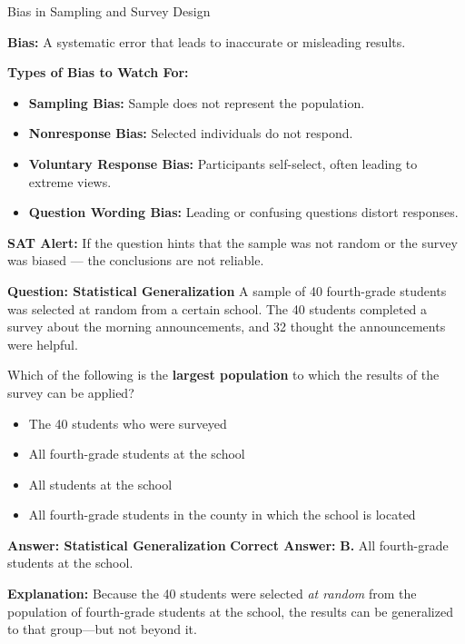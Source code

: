 \documentclass{beamer}
\begin{document}
\begin{frame}{Bias in Sampling and Survey Design}
\small

\textbf{Bias:} A systematic error that leads to inaccurate or misleading results.

\vspace{0.2cm}
\textbf{Types of Bias to Watch For:}
\begin{itemize}
    \item \textbf{Sampling Bias:} Sample does not represent the population.
    \item \textbf{Nonresponse Bias:} Selected individuals do not respond.
    \item \textbf{Voluntary Response Bias:} Participants self-select, often leading to extreme views.
    \item \textbf{Question Wording Bias:} Leading or confusing questions distort responses.
\end{itemize}

\textbf{SAT Alert:}  
If the question hints that the sample was not random or the survey was biased — the conclusions are not reliable.

\end{frame}





\begin{frame}{\textbf{Question: Statistical Generalization}}
A sample of 40 fourth-grade students was selected at random from a certain school. 
The 40 students completed a survey about the morning announcements, and 32 thought the announcements were helpful. 

Which of the following is the \textbf{largest population} to which the results of the survey can be applied?

\begin{itemize}
    \item[A.] The 40 students who were surveyed
    \item[B.] All fourth-grade students at the school
    \item[C.] All students at the school
    \item[D.] All fourth-grade students in the county in which the school is located
\end{itemize}
\end{frame}

\begin{frame}{\textbf{Answer: Statistical Generalization}}
\textbf{Correct Answer:} \textbf{B.} All fourth-grade students at the school.

\textbf{Explanation:} 
Because the 40 students were selected \textit{at random} from the population of fourth-grade students at the school, the results can be generalized to that group—but not beyond it.
\end{frame}
\end{document}
